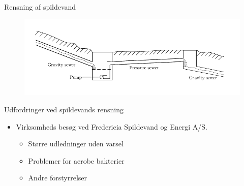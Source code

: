 

\begin{frame}{Rensning af spildevand}{}
\vfill\vfill\centering
\begin{figure}[H]
\centering
\includegraphics[width=1\textwidth]{Sections/pictures/Sewer_drawing.pdf}
\end{figure}
\vfill\vfill
\end{frame}
%


\begin{frame}{Udfordringer ved spildevands rensning}{}
\vfill\vfill\centering
\begin{itemize}
	\item<1-> Virksomheds besøg ved Fredericia Spildevand og Energi A/S.
	
	\begin{itemize}
		\item<2-> Større udledninger uden varsel
		\vspace{2mm}
		\item<3-> Problemer for aerobe bakterier
		\vspace{2mm}
		\item<4-> Andre forstyrrelser
	\end{itemize}	

\end{itemize}
\vfill\vfill
\end{frame}

